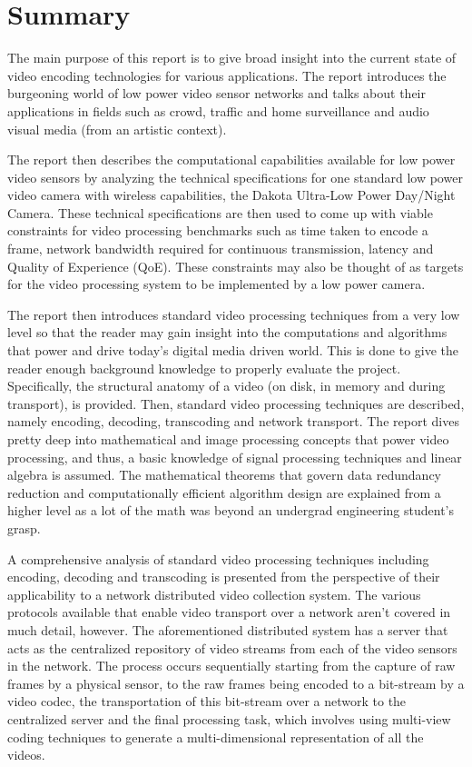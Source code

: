 \documentclass[letterpaper,12pt,titlepage,oneside,final]{report}
\begin{document}
\chapter*{Summary}
    The main purpose of this report is to give broad insight into the current state of video encoding technologies for various applications. The report introduces the burgeoning world of low power video sensor networks and talks about their applications in fields such as crowd, traffic and home surveillance and audio visual media (from an artistic context). 

    The report then describes the computational capabilities available for low power video sensors by analyzing the technical specifications for one standard low power video camera with wireless capabilities, the Dakota Ultra-Low Power Day/Night Camera. These technical specifications are then used to come up with viable constraints for video processing benchmarks such as time taken to encode a frame, network bandwidth required for continuous transmission, latency and Quality of Experience (QoE). These constraints may also be thought of as targets for the video processing system to be implemented by a low power camera.

    The report then introduces standard video processing techniques from a very low level so that the reader may gain insight into the computations and algorithms that power and drive today's digital media driven world. This is done to give the reader enough background knowledge to properly evaluate the project. Specifically, the structural anatomy of a video (on disk, in memory and during transport), is provided. Then, standard video processing techniques are described, namely encoding, decoding, transcoding and network transport. The report dives pretty deep into mathematical and image processing concepts that power video processing, and thus, a basic knowledge of signal processing techniques and linear algebra is assumed. The mathematical theorems that govern data redundancy reduction and computationally efficient algorithm design are explained from a higher level as a lot of the math was beyond an undergrad engineering student's grasp.
    
    A comprehensive analysis of standard video processing techniques including encoding, decoding and transcoding is presented from the perspective of their applicability to a network distributed video collection system. The various protocols available that enable video transport over a network aren't covered in much detail, however. The aforementioned distributed system has a server that acts as the centralized repository of video streams from each of the video sensors in the network. The process occurs sequentially starting from the capture of raw frames by a physical sensor, to the raw frames being encoded to a bit-stream by a video codec, the transportation of this bit-stream over a network to the centralized server and the final processing task, which involves using multi-view coding techniques to generate a multi-dimensional representation of all the videos. 
\end{document}
